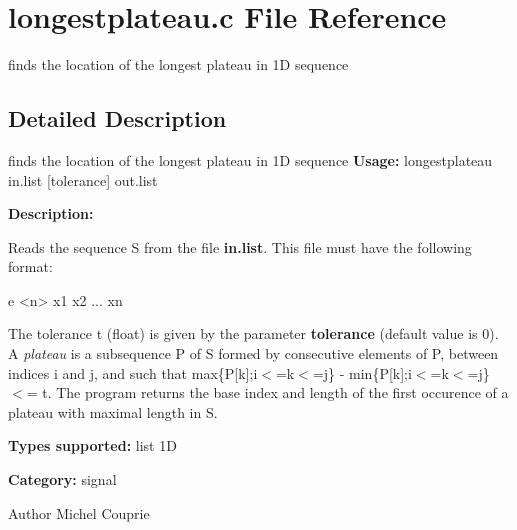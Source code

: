 \section{longestplateau.c File Reference}
\label{longestplateau_8c}


finds the location of the longest plateau in 1D sequence  




\subsection{Detailed Description}
finds the location of the longest plateau in 1D sequence {\bfseries Usage:} longestplateau in.list [tolerance] out.list

{\bfseries Description:}

Reads the sequence S from the file {\bfseries in.list}. This file must have the following format: 
\begin{DoxyPre}  
  e <n>
  x1
  x2
  ...
  xn
\end{DoxyPre}
 The tolerance t (float) is given by the parameter {\bfseries tolerance} (default value is 0). A {\itshape plateau\/} is a subsequence P of S formed by consecutive elements of P, between indices i and j, and such that max\{P[k];i$<$=k$<$=j\} -\/ min\{P[k];i$<$=k$<$=j\} $<$= t. The program returns the base index and length of the first occurence of a plateau with maximal length in S.

{\bfseries Types supported:} list 1D

{\bfseries Category:} signal

\begin{DoxyAuthor}{Author}
Michel Couprie 
\end{DoxyAuthor}
